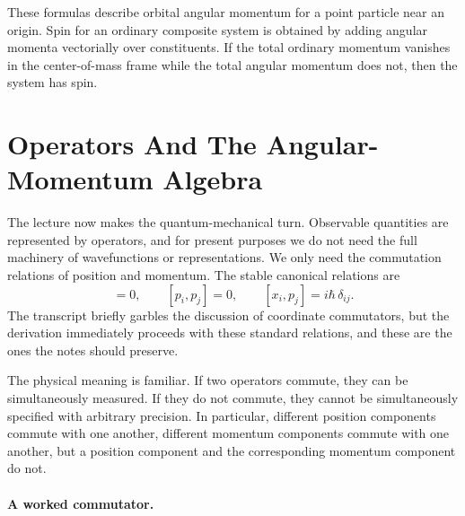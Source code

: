 These formulas describe orbital angular momentum for a point particle near an origin. Spin for an ordinary composite system is obtained by adding angular momenta vectorially over constituents. If the total ordinary momentum vanishes in the center-of-mass frame while the total angular momentum does not, then the system has spin.

\section{Operators And The Angular-Momentum Algebra}

The lecture now makes the quantum-mechanical turn. Observable quantities are represented by operators, and for present purposes we do not need the full machinery of wavefunctions or representations. We only need the commutation relations of position and momentum. The stable canonical relations are
\begin{equation}
[x_i,x_j]=0,\qquad [p_i,p_j]=0,\qquad [x_i,p_j]=i\hbar\,\delta_{ij}.
\end{equation}
The transcript briefly garbles the discussion of coordinate commutators, but the derivation immediately proceeds with these standard relations, and these are the ones the notes should preserve.

The physical meaning is familiar. If two operators commute, they can be simultaneously measured. If they do not commute, they cannot be simultaneously specified with arbitrary precision. In particular, different position components commute with one another, different momentum components commute with one another, but a position component and the corresponding momentum component do not.

\paragraph{A worked commutator.}

